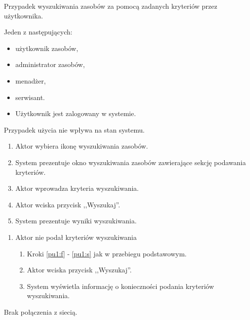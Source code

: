 Przypadek wyszukiwania zasobów za pomocą zadanych kryteriów przez użytkownika.

Jeden z następujących:
\begin{itemize}
\item użytkownik zasobów,
\item administrator zasobów,
\item menadżer,
\item serwisant.
\end{itemize}

\begin{itemize}
\item Użytkownik jest zalogowany w systemie.
\end{itemize}

Przypadek użycia nie wpływa na stan systemu.

\begin{enumerate}
\item \label{pu1:f} Aktor wybiera ikonę wyszukiwania zasobów.
\item \label{pu1:s}System prezentuje okno wyszukiwania zasobów zawierające sekcję podawania kryteriów.
\item Aktor wprowadza kryteria wyszukiwania.
\item Aktor wciska przycisk ,,Wyszukaj''.
\item System prezentuje wyniki wyszukiwania.
\end{enumerate}

\begin{enumerate}
\item Aktor nie podał kryteriów wyszukiwania
	\begin{enumerate}[label*=\arabic*.]
	\item Kroki \ref{pu1:f} - \ref{pu1:s} jak w przebiegu podstawowym.
	\item Aktor wciska przycisk ,,Wyszukaj''.
	\item System wyświetla informację o konieczności podania kryteriów wyszukiwania.
	\end{enumerate}
\end{enumerate}

Brak połączenia z siecią.

